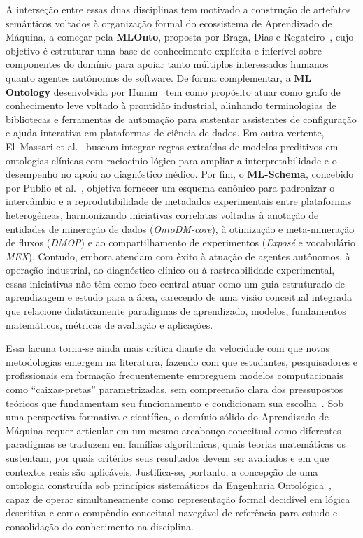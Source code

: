 \documentclass[11pt,a4paper]{article}
\begin{document}
A interseção entre essas duas disciplinas tem motivado a construção de artefatos semânticos voltados à organização formal do ecossistema de Aprendizado de Máquina, a começar pela \textbf{MLOnto}, proposta por Braga, Dias e Regateiro~\cite{braga2020mlonto}, cujo objetivo é estruturar uma base de conhecimento explícita e inferível sobre componentes do domínio para apoiar tanto múltiplos interessados humanos quanto agentes autônomos de software. De forma complementar, a \textbf{ML Ontology} desenvolvida por Humm~\cite{humm2026industry} tem como propósito atuar como grafo de conhecimento leve voltado à prontidão industrial, alinhando terminologias de bibliotecas e ferramentas de automação para sustentar assistentes de configuração e ajuda interativa em plataformas de ciência de dados. Em outra vertente, El~Massari et al.~\cite{elmassari2022diabetes} buscam integrar regras extraídas de modelos preditivos em ontologias clínicas com raciocínio lógico para ampliar a interpretabilidade e o desempenho no apoio ao diagnóstico médico. Por fim, o \textbf{ML-Schema}, concebido por Publio et al.~\cite{publio2018mlschema}, objetiva fornecer um esquema canônico para padronizar o intercâmbio e a reprodutibilidade de metadados experimentais entre plataformas heterogêneas, harmonizando iniciativas correlatas voltadas à anotação de entidades de mineração de dados (\emph{OntoDM-core}), à otimização e meta-mineração de fluxos (\emph{DMOP}) e ao compartilhamento de experimentos (\emph{Exposé} e vocabulário \emph{MEX}). Contudo, embora atendam com êxito à atuação de agentes autônomos, à operação industrial, ao diagnóstico clínico ou à rastreabilidade experimental, essas iniciativas não têm como foco central atuar como um guia estruturado de aprendizagem e estudo para a área, carecendo de uma visão conceitual integrada que relacione didaticamente paradigmas de aprendizado, modelos, fundamentos matemáticos, métricas de avaliação e aplicações.

Essa lacuna torna-se ainda mais crítica diante da velocidade com que novas metodologias emergem na literatura, fazendo com que estudantes, pesquisadores e profissionais em formação frequentemente empreguem modelos computacionais como ``caixas-pretas'' parametrizadas, sem compreensão clara dos pressupostos teóricos que fundamentam seu funcionamento e condicionam sua escolha~\cite{sarker2021ml}. Sob uma perspectiva formativa e científica, o domínio sólido do Aprendizado de Máquina requer articular em um mesmo arcabouço conceitual como diferentes paradigmas se traduzem em famílias algorítmicas, quais teorias matemáticas os sustentam, por quais critérios seus resultados devem ser avaliados e em que contextos reais são aplicáveis. Justifica-se, portanto, a concepção de uma ontologia construída sob princípios sistemáticos da Engenharia Ontológica~\cite{fernandez1997methontology}, capaz de operar simultaneamente como representação formal decidível em lógica descritiva e como compêndio conceitual navegável de referência para estudo e consolidação do conhecimento na disciplina.
\end{document}
